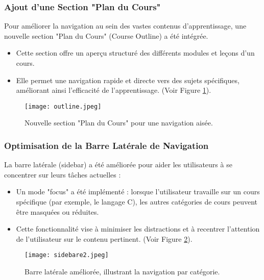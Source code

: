 \documentclass[12pt, a4paper]{article}
\begin{document}
\subsubsection{Ajout d'une Section "Plan du Cours"}
Pour améliorer la navigation au sein des vastes contenus d'apprentissage, une nouvelle section "Plan du Cours" (Course Outline) a été intégrée.
\begin{itemize}
    \item Cette section offre un aperçu structuré des différents modules et leçons d'un cours.
    \item Elle permet une navigation rapide et directe vers des sujets spécifiques, améliorant ainsi l'efficacité de l'apprentissage. (Voir Figure \ref{fig:course_outline}).
\end{itemize}

\begin{figure}[htbp]
  \centering
  \texttt{[image: outline.jpeg]} %
  \caption{Nouvelle section "Plan du Cours" pour une navigation aisée.}
  \label{fig:course_outline}
\end{figure}

\subsubsection{Optimisation de la Barre Latérale de Navigation}
La barre latérale (sidebar) a été améliorée pour aider les utilisateurs à se concentrer sur leurs tâches actuelles :
\begin{itemize}
    \item Un mode "focus" a été implémenté : lorsque l'utilisateur travaille sur un cours spécifique (par exemple, le langage C), les autres catégories de cours peuvent être masquées ou réduites.
    \item Cette fonctionnalité vise à minimiser les distractions et à recentrer l'attention de l'utilisateur sur le contenu pertinent. (Voir Figure \ref{fig:sidebar_context}).
\end{itemize}

\begin{figure}[htbp]
  \centering
  \texttt{[image: sidebare2.jpeg]} %
  \caption{Barre latérale améliorée, illustrant la navigation par catégorie.}
  \label{fig:sidebar_context}
\end{figure}
\end{document}
